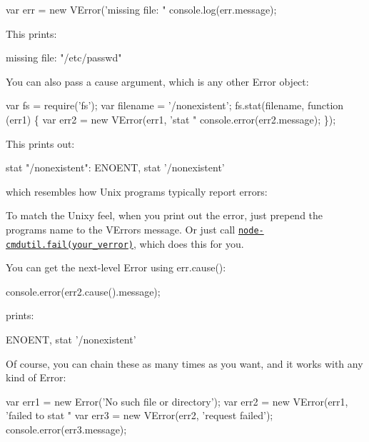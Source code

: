 \begin{DoxyCode}
var err = new VError('missing file: "%
console.log(err.message);
\end{DoxyCode}


This prints\+: \begin{DoxyVerb}missing file: "/etc/passwd"
\end{DoxyVerb}


You can also pass a {\ttfamily cause} argument, which is any other Error object\+:


\begin{DoxyCode}
var fs = require('fs');
var filename = '/nonexistent';
fs.stat(filename, function (err1) \{
  var err2 = new VError(err1, 'stat "%
  console.error(err2.message);
\});
\end{DoxyCode}


This prints out\+: \begin{DoxyVerb}stat "/nonexistent": ENOENT, stat '/nonexistent'
\end{DoxyVerb}


which resembles how Unix programs typically report errors\+: 


To match the Unixy feel, when you print out the error, just prepend the program\textquotesingle{}s name to the V\+Error\textquotesingle{}s {\ttfamily message}. Or just call \href{https://github.com/joyent/node-cmdutil}{\tt node-\/cmdutil.\+fail(your\+\_\+verror)}, which does this for you.

You can get the next-\/level Error using {\ttfamily err.\+cause()}\+:


\begin{DoxyCode}
console.error(err2.cause().message);
\end{DoxyCode}


prints\+: \begin{DoxyVerb}ENOENT, stat '/nonexistent'
\end{DoxyVerb}


Of course, you can chain these as many times as you want, and it works with any kind of Error\+:


\begin{DoxyCode}
var err1 = new Error('No such file or directory');
var err2 = new VError(err1, 'failed to stat "%
var err3 = new VError(err2, 'request failed');
console.error(err3.message);
\end{DoxyCode}


